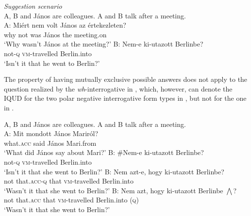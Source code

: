 \documentclass[output=paper,colorlinks,citecolor=brown]{langscibook}
\begin{document}
	\ea\label{ex:sugg2}  
	\textit{Suggestion scenario}\\
	A, B and János are colleagues. A and B talk after a meeting.\\
	\ea A: 
	\gll Miért nem volt János az értekezleten?\\
    why not was János the meeting.on\\
	\glt \hspace{0.4cm}`Why wasn't János at the meeting?'
	\ex B:  \gll Nem-e  ki-utazott Berlinbe?\\
    not-\textsc{q} \textsc{vm}-travelled Berlin.into\\
	\glt \hspace{0.4cm} `Isn't it that he went to Berlin?' 
	\z
	\z
	
	The property of having mutually exclusive possible answers does not apply to the question realized by the  \textit{wh}-interrogative in , which, however, can denote the IQUD for the two polar negative interrogative form types in , but not for the one in .
	
	\ea\label{ex:said}  
	A, B and János are colleagues. A and B talk after a meeting.\\
	\ea\label{ex:saida}
	\gll A: Mit mondott János Mariról?\\
	{} what.\textsc{acc} said János Mari.from\\
	\glt \hspace{0.4cm}`What did János say about Mari?'
	\ex\label{ex:said-ans} B: \#\gll Nem-e  ki-utazott Berlinbe?\\
    not-\textsc{q} \textsc{vm}-travelled Berlin.into\\
	\glt \hspace{0.4cm}`Isn't it that she went to Berlin?' 
	\ex\label{ex:saidb}
	\gll B: Nem azt-e, hogy  ki-utazott Berlinbe?\\
	\hspace{0.5cm} not that.\textsc{acc}-\textsc{q} that \textsc{vm}-travelled Berlin.into\\ 
	\glt\hspace{0.5cm} `Wasn't it that she went to Berlin?'
	\ex\label{ex:saidc} 
	\gll B: Nem azt, hogy  ki-utazott Berlinbe $\bigwedge$?\\
	\hspace{0.5cm} not that.\textsc{acc} that \textsc{vm}-travelled Berlin.into (\textsc{q})\\ 
	\glt \hspace{0.5cm} `Wasn't it that she went to Berlin?'
	\z
	\z
	
\end{document}
